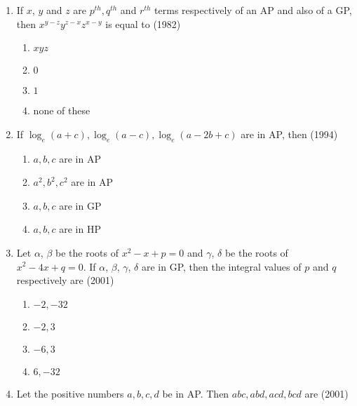 \begin{enumerate}[label=\thesubsection.\arabic*,ref=\thesubsection.\theenumi]
\begin{multicols}{4}
\begin{enumerate}
\item AP
\item HP
\item GP
\item None of these
\end{enumerate}
\end{multicols}
%
\item  If $x$, $y$ and $z$ are $p^{th}, q^{th}$ and $r^{th}$ terms respectively of an AP and also of a GP,  then ${x^{y-z} y^{z-x} z^{x-y}}$ 
		    is equal to \hfill{(1982)}
\begin{multicols}{4}
\begin{enumerate}     
  \item $xyz$ 
  \item $0$
  \item $1$ 
  \item none of these
  \end{enumerate}
\end{multicols}
%
\item If $\log_e(a+c), \log_e(a-c), \log_e(a-2b+c)$ are in AP, then \hfill (1994)
    \begin{multicols}{2}
%        
\begin{enumerate}    
        \item $a, b, c$ are in AP
        \item $a^2, b^2, c^2$ are in AP
        \item $a, b, c$ are in GP
        \item $a, b, c$ are in HP
    \end{enumerate}
    \end{multicols}
\item Let $\alpha$, $\beta$ be the roots of $x^2-x+p=0$ and $\gamma$, $\delta$ be the roots of $x^2-4x+q=0$. If $\alpha$, $\beta$, $\gamma$, $\delta$ are in GP, then the integral values of $p$ and $q$ respectively are \hfill(2001)
            \begin{multicols}{4}
\begin{enumerate}    
                \item $-2, -32$
                \item $-2, 3$
                \item $-6, 3$
                \item $6, -32$
%        
    \end{enumerate}
    \end{multicols}
\item Let the positive numbers $a, b, c, d$ be in AP. Then $abc, abd, acd, bcd$ are \hfill(2001)

\end{enumerate}

